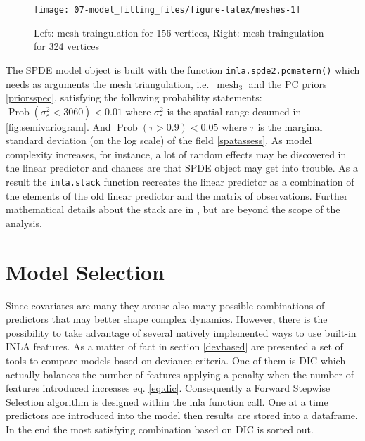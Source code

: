 \documentclass[
  12pt,
  a4paper,
  oneside]{book}
\newcommand{\passthrough}[1]{#1}
\theoremstyle{definition}
\theoremstyle{definition}
\theoremstyle{definition}
\theoremstyle{remark}
\begin{document}
\begin{figure}

{\centering \texttt{[image: 07-model\_fitting\_files/figure-latex/meshes-1]} 

}

\caption{Left: mesh traingulation for 156 vertices, Right: mesh traingulation for 324 vertices}\label{fig:meshes}
\end{figure}

The SPDE model object is built with the function \passthrough{\lstinline!inla.spde2.pcmatern()!} which needs as arguments the mesh triangulation, i.e.~\(\operatorname{mesh}_3\) and the PC priors \ref{priorsspec}, satisfying the following probability statements: \(\operatorname{Prob}(\sigma_{\varepsilon}^2<3060)< 0.01\) where \(\sigma_{\varepsilon}^2\) is the spatial range desumed in \ref{fig:semivariogram}. And \(\operatorname{Prob}(\tau> 0.9)< 0.05\) where \(\tau\) is the marginal standard deviation (on the log scale) of the field \ref{spatassess}.
As model complexity increases, for instance, a lot of random effects may be discovered in the linear predictor and chances are that SPDE object may get into trouble. As a result the \passthrough{\lstinline!inla.stack!} function recreates the linear predictor as a combination of the elements of the old linear predictor and the matrix of observations. Further mathematical details about the stack are in \citet{Blangiardo-Cameletti}, but are beyond the scope of the analysis.

\hypertarget{model-selection}{%
\section{Model Selection}\label{model-selection}}

Since covariates are many they arouse also many possible combinations of predictors that may better shape complex dynamics. However, there is the possibility to take advantage of several natively implemented ways to use built-in INLA features. As a matter of fact in section \ref{devbased} are presented a set of tools to compare models based on deviance criteria. One of them is DIC which actually balances the number of features applying a penalty when the number of features introduced increases eq. \eqref{eq:dic}.
Consequently a Forward Stepwise Selection \citep{guyon2003introduction} algorithm is designed within the inla function call. One at a time predictors are introduced into the model then results are stored into a dataframe. In the end the most satisfying combination based on DIC is sorted out.
\end{document}
